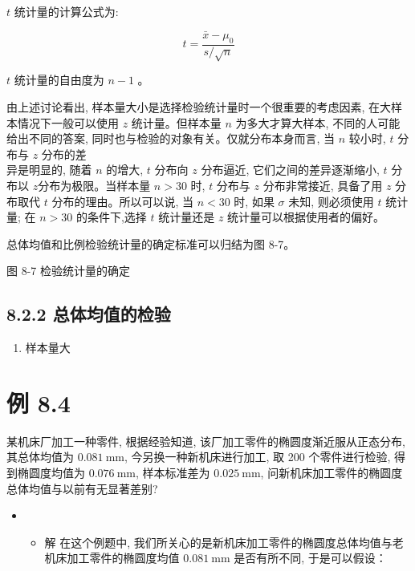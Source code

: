 \documentclass[10pt]{article}
\begin{document}
\begin{CJK*}{UTF8}{bsmi}
$t$ 统计量的计算公式为:


\begin{equation*}
t=\frac{\bar{x}-\mu_{0}}{s / \sqrt{n}} \tag{8.2}
\end{equation*}


$t$ 统计量的自由度为 $n-1$ 。

由上述讨论看出, 样本量大小是选择检验统计量时一个很重要的考虑因素, 在大样本情况下一般可以使用 $z$ 统计量。但样本量 $n$ 为多大才算大样本, 不同的人可能给出不同的答案, 同时也与检验的对象有关。仅就分布本身而言, 当 $n$ 较小时, $t$ 分布与 $z$ 分布的差\\
异是明显的, 随着 $n$ 的增大, $t$ 分布向 $z$ 分布逼近, 它们之间的差异逐渐缩小, $t$ 分布以 $z$分布为极限。当样本量 $n>30$ 时, $t$ 分布与 $z$ 分布非常接近, 具备了用 $z$ 分布取代 $t$ 分布的理由。所以可以说, 当 $n<30$ 时, 如果 $\sigma$ 未知, 则必须使用 $t$ 统计量; 在 $n>30$ 的条件下,选择 $t$ 统计量还是 $z$ 统计量可以根据使用者的偏好。

总体均值和比例检验统计量的确定标准可以归结为图 8-7。

\begin{center}
\end{center}

图 8-7 检验统计量的确定

\subsection*{8.2.2 总体均值的检验}
\begin{enumerate}
  \item 样本量大
\end{enumerate}

\section*{例 8.4}
某机床厂加工一种零件, 根据经验知道, 该厂加工零件的椭圆度渐近服从正态分布,其总体均值为 $0.081 \mathrm{~mm}$, 今另换一种新机床进行加工, 取 200 个零件进行检验, 得到椭圆度均值为 $0.076 \mathrm{~mm}$, 样本标准差为 $0.025 \mathrm{~mm}$, 问新机床加工零件的椭圆度总体均值与以前有无显著差别?

\begin{itemize}
  \item 
  \begin{itemize}
    \item 解 在这个例题中, 我们所关心的是新机床加工零件的椭圆度总体均值与老机床加工零件的椭圆度均值 $0.081 \mathrm{~mm}$ 是否有所不同, 于是可以假设：
  \end{itemize}
\end{itemize}


\end{CJK*}
\end{document}
